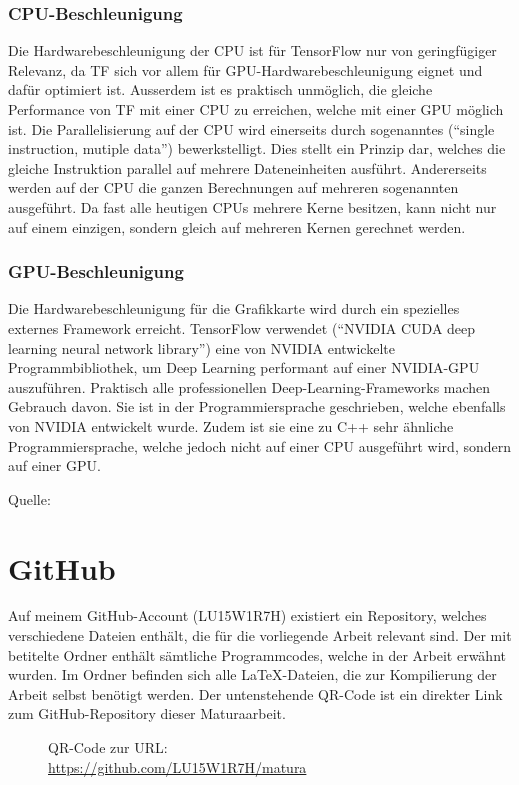 \begin{appendices}
\subsection*{CPU-Beschleunigung}
Die Hardwarebeschleunigung der CPU ist für TensorFlow nur von geringfügiger
Relevanz, da TF sich vor allem für GPU-Hardwarebeschleunigung eignet
und dafür optimiert ist. Ausserdem ist es praktisch unmöglich, die gleiche
Performance von TF mit einer CPU zu erreichen, welche mit einer GPU möglich ist.
\para{}
Die Parallelisierung auf der CPU wird einerseits durch sogenanntes 
(``single instruction, mutiple data'') bewerkstelligt. Dies stellt ein Prinzip
dar, welches die gleiche Instruktion parallel auf mehrere Dateneinheiten
ausführt.
Andererseits werden auf der CPU die ganzen Berechnungen auf mehreren sogenannten
 ausgeführt. Da fast alle heutigen CPUs mehrere Kerne
besitzen, kann nicht nur auf einem einzigen, sondern gleich auf mehreren
Kernen gerechnet werden.

\subsection*{GPU-Beschleunigung}
Die Hardwarebeschleunigung für die Grafikkarte wird durch ein spezielles
externes Framework erreicht. TensorFlow verwendet  (``NVIDIA CUDA
deep learning neural network library'') eine von
NVIDIA entwickelte Programmbibliothek, um Deep Learning performant auf einer NVIDIA-GPU
auszuführen. Praktisch alle professionellen Deep-Learning-Frameworks machen
Gebrauch davon. Sie ist in der Programmiersprache
 geschrieben, welche ebenfalls von NVIDIA entwickelt wurde. Zudem
ist sie eine zu C++ sehr ähnliche Programmiersprache, welche jedoch nicht auf
einer CPU ausgeführt wird, sondern auf einer GPU.

Quelle: \cite{net:cudnn}


\chapter{GitHub}
Auf meinem GitHub-Account (LU15W1R7H) existiert ein Repository, welches verschiedene
Dateien enthält, die für die vorliegende Arbeit relevant sind.
Der mit  betitelte Ordner enthält sämtliche
Programmcodes, welche in der Arbeit erwähnt wurden. Im Ordner 
befinden sich alle \LaTeX{}-Dateien, die zur Kompilierung der Arbeit selbst
benötigt werden. Der untenstehende QR-Code ist ein direkter Link zum
GitHub-Repository dieser Maturaarbeit.
\para{}
\begin{wrapfigure}{R}{3.5cm}
  \centering
  \caption{QR-Code zur URL:\\ \protect\url{https://github.com/LU15W1R7H/matura}}
\end{wrapfigure}



\end{appendices}

